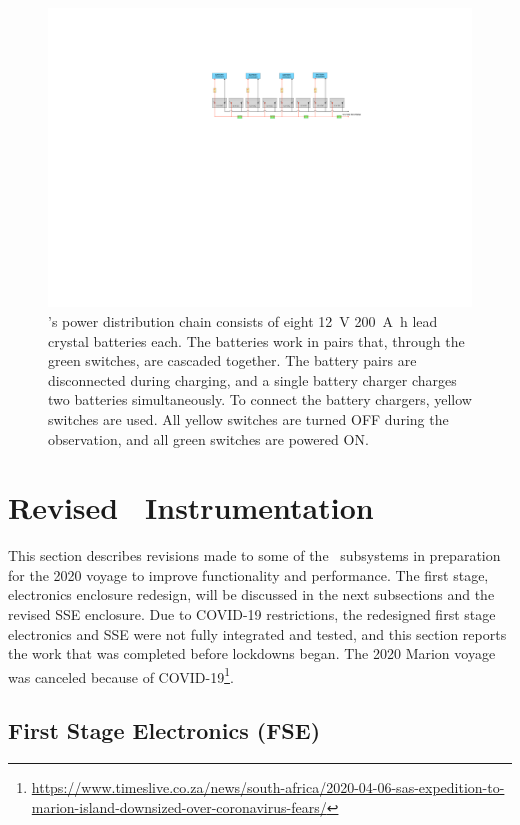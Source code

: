\begin{figure}
	\centering
	\includegraphics[width=\linewidth]{Figures/power_schematic}
	\caption{\prizm's power distribution chain consists of eight \SI{12}{\volt} \SI{200}{\ampere \hour} lead crystal batteries each. The batteries work in pairs that, through the green switches, are cascaded together. The battery pairs are disconnected during charging, and a single battery charger charges two batteries simultaneously. To connect the battery chargers, yellow switches are used. All yellow switches are turned OFF during the observation, and all green switches are powered ON.}
	\label{Fig:power}
\end{figure}

\section{Revised \prizm~Instrumentation}

This section describes revisions made to some of the \prizm\ subsystems in preparation for the 2020 voyage to improve functionality and performance. The first stage, electronics enclosure redesign, will be discussed in the next subsections and the revised SSE enclosure. Due to COVID-19 restrictions, the redesigned first stage electronics and SSE were not fully integrated and tested, and this section reports the work that was completed before lockdowns began. The 2020 Marion voyage was canceled because of COVID-19\footnote{\url{https://www.timeslive.co.za/news/south-africa/2020-04-06-sas-expedition-to-marion-island-downsized-over-coronavirus-fears/}}. 

\subsection{First Stage Electronics (FSE)}

